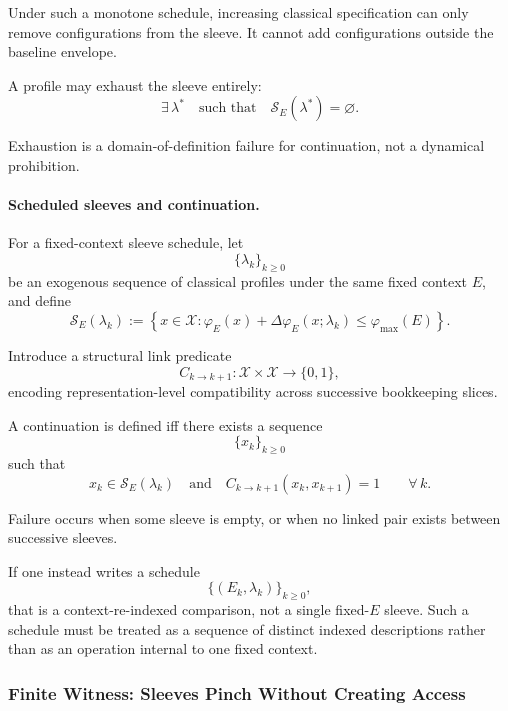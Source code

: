 \documentclass[aps,prx,onecolumn,11pt]{revtex4-2}
\theoremstyle{plain}
\theoremstyle{definition}
\theoremstyle{remark}
\begin{document}
Under such a monotone schedule, increasing classical specification can
only remove configurations from the sleeve. It cannot add
configurations outside the baseline envelope.

A profile may exhaust the sleeve entirely:
\begin{equation}
\exists\,\lambda^\ast
\quad\text{such that}\quad
\mathcal S_E(\lambda^\ast)=\varnothing.
\label{eq:sleeve_empty}
\end{equation}

Exhaustion is a domain-of-definition failure for continuation, not a
dynamical prohibition.

\paragraph{Scheduled sleeves and continuation.}

For a fixed-context sleeve schedule, let
\[
\{\lambda_k\}_{k\geq0}
\]
be an exogenous sequence of classical profiles under the same fixed
context \(E\), and define
\begin{equation}
\mathcal S_E(\lambda_k)
:=
\left\{
x\in\mathcal X:
\varphi_E(x)
+
\Delta\varphi_E(x;\lambda_k)
\leq
\varphi_{\max}(E)
\right\}.
\label{eq:sleeve_timeindexed_fixedE}
\end{equation}

Introduce a structural link predicate
\[
C_{k\to k+1}:\mathcal X\times\mathcal X\to\{0,1\},
\]
encoding representation-level compatibility across successive
bookkeeping slices.

A continuation is defined iff there exists a sequence
\[
\{x_k\}_{k\geq0}
\]
such that
\begin{equation}
x_k\in\mathcal S_E(\lambda_k)
\quad\text{and}\quad
C_{k\to k+1}(x_k,x_{k+1})=1
\qquad
\forall\,k.
\label{eq:feasible_chain_linked}
\end{equation}

Failure occurs when some sleeve is empty, or when no linked pair exists
between successive sleeves.

If one instead writes a schedule
\[
\{(E_k,\lambda_k)\}_{k\geq0},
\]
that is a context-re-indexed comparison, not a single fixed-\(E\)
sleeve. Such a schedule must be treated as a sequence of distinct
indexed descriptions rather than as an operation internal to one fixed
context.

\subsubsection{Finite Witness: Sleeves Pinch Without Creating Access}
\label{subsubsec:toy_sleeves_finite_witness}
\end{document}
